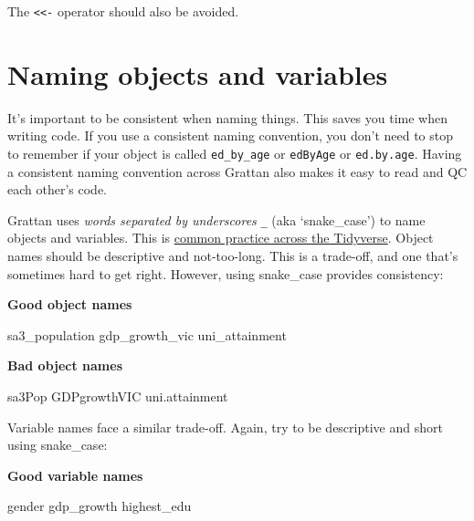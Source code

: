 \documentclass[]{book}
\newenvironment{Shaded}{\begin{snugshade}}{\end{snugshade}}
\newcommand{\NormalTok}[1]{#1}
\begin{document}
The \texttt{\textless{}\textless{}-} operator should also be avoided.

\hypertarget{naming-objects-and-variables}{%
\section{Naming objects and variables}\label{naming-objects-and-variables}}

It's important to be consistent when naming things. This saves you time when writing code. If you use a consistent naming convention, you don't need to stop to remember if your object is called \texttt{ed\_by\_age} or \texttt{edByAge} or \texttt{ed.by.age}. Having a consistent naming convention across Grattan also makes it easy to read and QC each other's code.

Grattan uses \emph{words separated by underscores} \texttt{\_} (aka `snake\_case') to name objects and variables. This is \href{https://style.tidyverse.org/syntax.html\#object-names}{common practice across the Tidyverse}.
Object names should be descriptive and not-too-long. This is a trade-off, and one that's sometimes hard to get right. However, using snake\_case provides consistency:

\textbf{Good object names}

\begin{Shaded}
\begin{Highlighting}[]
\NormalTok{sa3_population}
\NormalTok{gdp_growth_vic}
\NormalTok{uni_attainment}
\end{Highlighting}
\end{Shaded}

\textbf{Bad object names}

\begin{Shaded}
\begin{Highlighting}[]
\NormalTok{sa3Pop}
\NormalTok{GDPgrowthVIC}
\NormalTok{uni.attainment}
\end{Highlighting}
\end{Shaded}

Variable names face a similar trade-off. Again, try to be descriptive and short using snake\_case:

\textbf{Good variable names}

\begin{Shaded}
\begin{Highlighting}[]
\NormalTok{gender}
\NormalTok{gdp_growth}
\NormalTok{highest_edu}
\end{Highlighting}
\end{Shaded}
\end{document}
